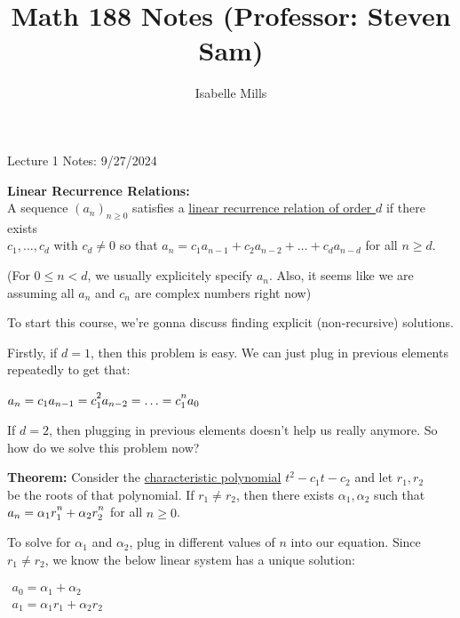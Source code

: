 \documentclass{book}
\title{Math 188 Notes (Professor: Steven Sam)}
\author{Isabelle Mills}
\newcommand{\hOne}{%
   \color{Black}%
   \fontsize{14}{16}\selectfont%
}
\newcommand{\hTwo}{%
\color{MidnightBlue}%
   \fontsize{13}{15}\selectfont%
}
\newcommand{\myComment}{%
   \color{RawerSienna}%
   \fontsize{12}{14}\selectfont%
}
\newenvironment{myIndent}{%
   \begin{adjustwidth}{2.5em}{0em}%
}{%
   \end{adjustwidth}%
}
\newenvironment{myTindent}{%
   \begin{adjustwidth}{7.5em}{0em}%
}{%
   \end{adjustwidth}%
}
\newcommand{\udefine}[1]{{%
   \setulcolor{Red}%
   \setul{0.14em}{0.07em}%
   \ul{#1}%
}}
\newcommand{\blab}[1]{\textbf{#1}}
\newcommand{\retTwo}{\hfill\bigbreak}
\newcommand{\mHeader}[1]{{
   \color{Black}%
   \fontsize{20}{18}\selectfont%
   #1\retTwo
}}
\begin{document}
\maketitle{}
\setul{0.14em}{0.07em}
\calibri

\hOne
\mHeader{Lecture 1 Notes: 9/27/2024}

\blab{Linear Recurrence Relations:}\\
A sequence $(a_n)_{n \geq 0}$ satisfies a \udefine{linear recurrence relation of order $d$} if there exists\\ $c_1, \ldots, c_d$ with $c_d \neq 0$ so that $a_n = c_1a_{n-1} + c_2a_{n-2} + \ldots + c_da_{n-d}$ for all $n \geq d$.

\begin{myTindent}\myComment
   (For $0 \leq n < d$, we usually explicitely specify $a_n$. Also, it seems like we are\\ assuming all $a_n$ and $c_n$ are complex numbers right now)\retTwo
\end{myTindent}

To start this course, we're gonna discuss finding explicit (non-recursive) solutions.\retTwo

Firstly, if $d = 1$, then this problem is easy. We can just plug in previous elements repeatedly to get that:

{\centering $a_n = c_1a_{n-1} = c_1^{\vphantom{|}2}a_{n-2} = \ldots = c_1^{\vphantom{|}n}a_0$ \retTwo\par}

If $d = 2$, then plugging in previous elements doesn't help us really anymore. So how do we solve this problem now?\\

\begin{myIndent}\hTwo
   \blab{Theorem:} Consider the \udefine{characteristic polynomial} $t^2 - c_1t - c_2$ and let $r_1, r_2$\\ be the roots of that polynomial. If $r_1 \neq r_2$, then there exists $\alpha_1, \alpha_2$ such that\\ $a_n = \alpha_1r_1^{\vphantom{|}n} + \alpha_2r_2^{\vphantom{|}n}$ for all $n \geq 0$.\retTwo

   To solve for $\alpha_1$ and $\alpha_2$, plug in different values of $n$ into our equation. Since $r_1 \neq r_2$, we know the below linear system has a unique solution:

   {\centering $ 
   \begin{matrix}
      a_0 = \alpha_1 + \alpha_2 \\ a_1 = \alpha_1 r_1 + \alpha_2 r_2
   \end{matrix}$ \retTwo\par}
\end{myIndent}
\end{document}
